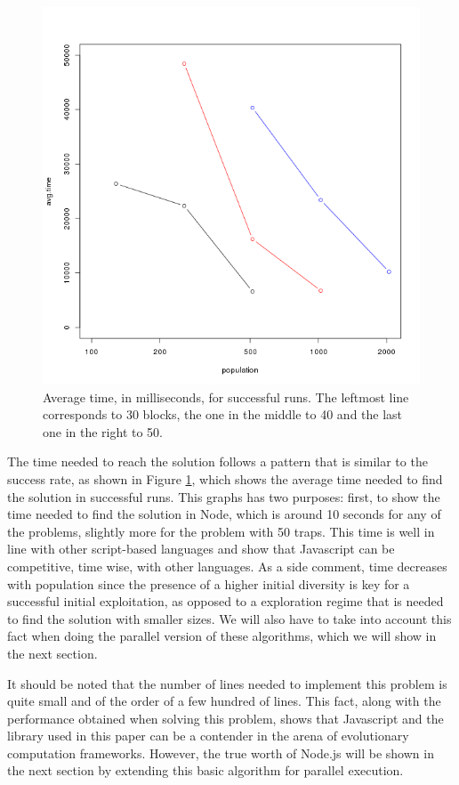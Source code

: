 \documentclass{sig-alternate}
\begin{document}
\begin{figure}[htb]
\centering
   \includegraphics[scale=0.4]{base-time-pop.png}
\caption{Average time, in milliseconds, for successful runs. The leftmost
  line corresponds to 30 blocks, the one in the middle to 40 and the
  last one in the right to 50. }
\label{fig:time}
\end{figure}

The time needed to reach the solution follows a pattern that is
similar to the success rate, as shown in Figure \ref{fig:time}, which
shows the average time needed to find the solution in successful
runs. This graphs has two purposes: first, to show the time needed to
find the solution in Node, which is around 10 seconds for any of the
problems, slightly more for the problem with 50 traps. This time is
well in line with other script-based languages and show that
Javascript can be competitive, time wise, with other languages. As a
side comment, time decreases with population since the presence of a
higher initial diversity is key for a successful initial exploitation,
as opposed to a exploration regime that is needed to find the solution
with smaller sizes. We will also have to take into account this fact
when doing the parallel version of these algorithms, which we will
show in the next section.

It should be noted that the number of lines needed to implement this
problem is quite small and of the order of a few hundred of
lines. This fact, along with the performance obtained when solving
this problem, shows that Javascript and the library used in this paper
can be a contender in the arena of evolutionary computation
frameworks. However, the true worth of Node.js will be shown in the
next section by extending this basic algorithm for parallel execution.
\end{document}
